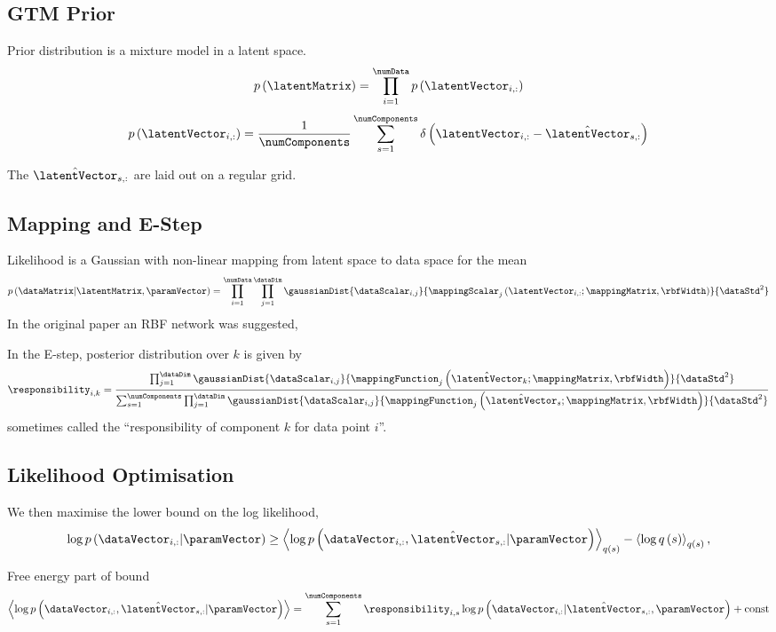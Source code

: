 \subsection{ GTM Prior}

Prior distribution is a mixture model in a latent space.
  \[
  p\left(\latentMatrix\right)=\prod_{i=1}^{\numData}p\left(\latentVector_{i,:}\right)
  \]
  \[
  p\left(\latentVector_{i,:}\right)=\frac{1}{\numComponents}\sum_{s=1}^{\numComponents}\delta\left(\latentVector_{i,:}-\hat{\latentVector}_{s,:}\right)
  \]

The $\hat{\latentVector}_{s,:}$ are laid out on a regular grid.

\subsection{Mapping and E-Step}

Likelihood is a Gaussian with non-linear mapping from latent space
  to data space for the mean
  \[
  p\left(\dataMatrix|\latentMatrix,\paramVector\right)=\prod_{i=1}^{\numData}\prod_{j=1}^{\dataDim}\gaussianDist{\dataScalar_{i,j}}{\mappingScalar_{j}\left(\latentVector_{i,:};\mappingMatrix,\rbfWidth\right)}{\dataStd^{2}}
  \]
  In the original paper \cite{Bishop:gtmncomp98} an RBF network was
  suggested,


In the E-step, posterior distribution over $k$ is given by 
  \[
  \responsibility_{i,k}=\frac{\prod_{j=1}^{\dataDim}\gaussianDist{\dataScalar_{i,j}}{\mappingFunction_{j}\left(\hat{\latentVector}_{k};\mappingMatrix,\rbfWidth\right)}{\dataStd^{2}}}{\sum_{s=1}^{\numComponents}\prod_{j=1}^{\dataDim}\gaussianDist{\dataScalar_{i,j}}{\mappingFunction_{j}\left(\hat{\latentVector}_{s};\mappingMatrix,\rbfWidth\right)}{\dataStd^{2}}}
  \]
sometimes called the ``responsibility of component $k$ for data
  point $i$''.

\subsection{Likelihood Optimisation}

We then maximise the lower bound on the log likelihood,
\[
  \log p\left(\dataVector_{i,:}|\paramVector\right)\geq\left\langle \log p\left(\dataVector_{i,:},\hat{\latentVector}_{s,:}|\paramVector\right)\right\rangle _{q\left(s\right)}-\left\langle \log q\left(s\right)\right\rangle _{q\left(s\right)},\]

Free energy part of bound 
  \[
  \left\langle \log p\left(\dataVector_{i,:},\hat{\latentVector}_{s,:}|\paramVector\right)\right\rangle =\sum_{s=1}^{\numComponents}\responsibility_{i,s}\log p\left(\dataVector_{i,:}|\hat{\latentVector}_{s,:},\paramVector\right)+\text{const}
  \]

